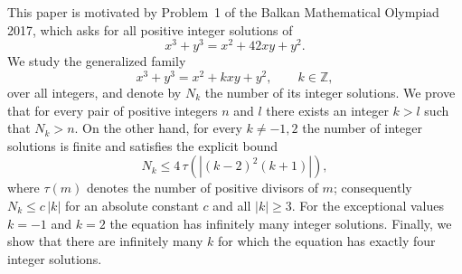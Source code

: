This paper is motivated by Problem~1 of the Balkan Mathematical Olympiad 2017, which asks for all positive integer solutions of
\[
x^3+y^3=x^2+42xy+y^2.
\]
We study the generalized family
\[
x^3+y^3=x^2+kxy+y^2,
\qquad k\in\mathbb Z,
\]
over all integers, and denote by $N_k$ the number of its integer solutions.
We prove that for every pair of positive integers $n$ and $l$ there exists an integer $k>l$ such that $N_k>n$.
On the other hand, for every $k\neq -1,2$ the number of integer solutions is finite and satisfies the explicit bound
\[
N_k \le 4\,\tau\!\left(\left|(k-2)^2(k+1)\right|\right),
\]
where $\tau(m)$ denotes the number of positive divisors of $m$; consequently $N_k\le c\,|k|$ for an absolute constant $c$ and all $|k|\ge 3$.
For the exceptional values $k=-1$ and $k=2$ the equation has infinitely many integer solutions.
Finally, we show that there are infinitely many $k$ for which the equation has exactly four integer solutions.
